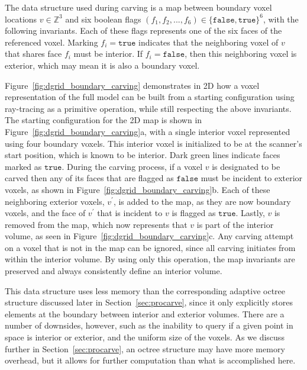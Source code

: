 \documentclass[12pt,onecolumn,oneside]{book}
\begin{document}
The data structure used during carving is a map between boundary voxel locations $v \in \mathbb{Z}^3$ and six boolean flags $(f_1,f_2,...,f_6) \in \{\texttt{false},\texttt{true}\}^6$, with the following invariants.  Each of these flags represents one of the six faces of the referenced voxel.  Marking $f_i = \texttt{true}$ indicates that the neighboring voxel of $v$ that shares face $f_i$ must be interior.  If $f_i = \texttt{false}$, then this neighboring voxel is exterior, which may mean it is also a boundary voxel.

Figure~\ref{fig:dgrid_boundary_carving} demonstrates in 2D how a voxel representation of the full model can be built from a starting configuration using ray-tracing as a primitive operation, while still respecting the above invariants.  The starting configuration for the 2D map is shown in Figure~\ref{fig:dgrid_boundary_carving}a, with a single interior voxel represented using four boundary voxels.  This interior voxel is initialized to be at the scanner's start position, which is known to be interior.  Dark green lines indicate faces marked as $\texttt{true}$.  During the carving process, if a voxel $v$ is designated to be carved then any of its faces that are flagged as $\texttt{false}$ must be incident to exterior voxels, as shown in Figure~\ref{fig:dgrid_boundary_carving}b.  Each of these neighboring exterior voxels, $v^{\prime}$, is added to the map, as they are now boundary voxels, and the face of $v^{\prime}$ that is incident to $v$ is flagged as $\texttt{true}$.  Lastly, $v$ is removed from the map, which now represents that $v$ is part of the interior volume, as seen in Figure~\ref{fig:dgrid_boundary_carving}c.  Any carving attempt on a voxel that is not in the map can be ignored, since all carving initiates from within the interior volume.  By using only this operation, the map invariants are preserved and always consistently define an interior volume.

This data structure uses less memory than the corresponding adaptive octree structure discussed later in Section~\ref{sec:procarve}, since it only explicitly stores elements at the boundary between interior and exterior volumes.  There are a number of downsides, however, such as the inability to query if a given point in space is interior or exterior, and the uniform size of the voxels.  As we discuss further in Section~\ref{sec:procarve}, an octree structure may have more memory overhead, but it allows for further computation than what is accomplished here.
\end{document}

